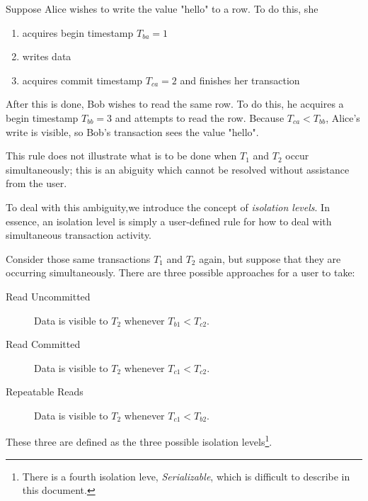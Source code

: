 \begin{exmp}
				Suppose Alice wishes to write the value "hello" to a row. To do this, she
				\begin{enumerate}
					\item acquires begin timestamp $T_{ba} = 1$
					\item writes data
					\item acquires commit timestamp $T_{ca} = 2$ and finishes her transaction
				\end{enumerate}
				After this is done, Bob wishes to read the same row. To do this, he acquires a begin timestamp $T_{bb} = 3$ and attempts to read the row. Because $T_{ca} < T_{bb}$, Alice's write is visible, so Bob's transaction sees the value "hello".
\end{exmp}

This rule does not illustrate what is to be done when $T_1$ and $T_2$ occur simultaneously; this is an abiguity which cannot be resolved without assistance from the user.

To deal with this ambiguity,we introduce the concept of \emph{isolation levels}. In essence, an isolation level is simply a user-defined rule for how to deal with simultaneous transaction activity.

Consider those same transactions $T_1$ and $T_2$ again, but suppose that they are occurring simultaneously. There are three possible approaches for a user to take:

\begin{description}
				\item[Read Uncommitted] Data is visible to $T_2$ whenever $T_{b1} < T_{c2}$.
				\item[Read Committed] Data is visible to $T_2$ whenever $T_{c1} < T_{c2}$.
				\item[Repeatable Reads] Data is visible to $T_2$ whenever $T_{c1} < T_{b2}$.
\end{description}

These three are defined as the three possible isolation levels\footnote{There is a fourth isolation leve, \emph{Serializable}, which is difficult to describe in this document.}.

